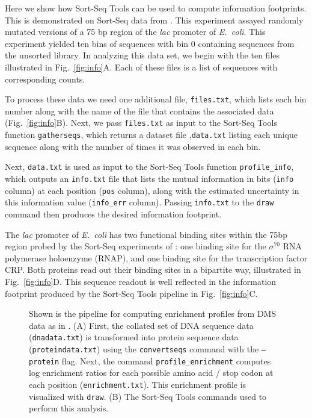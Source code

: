 \documentclass{bmcart}
\newcommand{\fig}[2]{Fig.\ \ref{#1}#2}
\begin{document}
Here we show how Sort-Seq Tools can be used to compute information footprints. This is demonstrated on Sort-Seq data from \cite{Kinney:2010tn}. This experiment assayed randomly mutated versions of a 75 bp region of the \textit{lac} promoter of \textit{E.\ coli}. This experiment yielded ten bins of sequences with bin 0 containing sequences from the unsorted library. In analyzing this data set, we begin with the ten files illustrated in \fig{fig:info}{A}. Each of these files is a list of sequences with corresponding counts.

To process these data we need one additional file, \texttt{files.txt}, which lists each bin number along with the name of the file that contains the associated data (\fig{fig:info}{B}). Next, we pass \texttt{files.txt} as input to the Sort-Seq Tools function \texttt{gatherseqs}, which returns a dataset file ,\texttt{data.txt} listing  each unique sequence along with the number of times it was observed in each bin. 

Next, \texttt{data.txt} is used as input to the Sort-Seq Tools function \texttt{profile\_info}, which outputs an \texttt{info.txt} file that lists the mutual information in bits (\texttt{info} column) at each position (\texttt{pos} column), along with the estimated uncertainty in this information value (\texttt{info\_err} column). Passing \texttt{info.txt} to the \texttt{draw} command then produces the desired information footprint. 

The \textit{lac} promoter of \textit{E.\ coli} has two functional binding sites within the 75bp region probed by the Sort-Seq experiments of \cite{Kinney:2010tn}: one binding site for the $\sigma^{70}$ RNA polymerase holoenzyme (RNAP), and one binding site for the transcription factor CRP. Both proteins read out their binding sites in a bipartite way, illustrated in \fig{fig:info}{D}. This sequence readout is well reflected in the information footprint produced by the Sort-Seq Tools pipeline in \fig{fig:info}{C}. 

%
%
\begin{figure}[h!]
\caption{
Shown is the pipeline for computing enrichment profiles from DMS data as in \cite{Fowler:2010gt}. (A) First, the collated set of DNA sequence data (\texttt{dnadata.txt}) is transformed into protein sequence data (\texttt{proteindata.txt}) using the \texttt{convertseqs} command with the \texttt{--protein} flag. Next, the command \texttt{profile\_enrichment} computes log enrichment ratios for each possible amino acid / stop codon at each position (\texttt{enrichment.txt}). This enrichment profile is visualized with \texttt{draw}. (B) The Sort-Seq Tools commands used to perform this analysis.
}
\label{fig:protein}
\end{figure}
\end{document}
